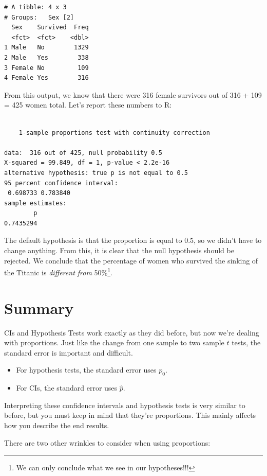 \documentclass[
  letterpaper,
  DIV=11,
  numbers=noendperiod,
  oneside]{scrreprt}
\providecommand{\tightlist}{%
  \setlength{\itemsep}{0pt}\setlength{\parskip}{0pt}}\usepackage{longtable,booktabs,array}
\begin{document}
\begin{verbatim}
# A tibble: 4 x 3
# Groups:   Sex [2]
  Sex    Survived  Freq
  <fct>  <fct>    <dbl>
1 Male   No        1329
2 Male   Yes        338
3 Female No         109
4 Female Yes        316
\end{verbatim}

From this output, we know that there were 316 female survivors out of
316 + 109 = 425 women total. Let's report these numbers to R:

\begin{verbatim}

    1-sample proportions test with continuity correction

data:  316 out of 425, null probability 0.5
X-squared = 99.849, df = 1, p-value < 2.2e-16
alternative hypothesis: true p is not equal to 0.5
95 percent confidence interval:
 0.698733 0.783840
sample estimates:
        p 
0.7435294 
\end{verbatim}

The default hypothesis is that the proportion is equal to 0.5, so we
didn't have to change anything. From this, it is clear that the null
hypothesis should be rejected. We conclude that the percentage of women
who survived the sinking of the Titanic is \emph{different from}
50\%\footnote{We can only conclude what we see in our hypotheses!!!}.

\hypertarget{summary-9}{%
\section{Summary}\label{summary-9}}

CIs and Hypothesis Tests work exactly as they did before, but now we're
dealing with proportions. Just like the change from one sample to two
sample \(t\) tests, the standard error is important and difficult.

\begin{itemize}
\tightlist
\item
  For hypothesis tests, the standard error uses \(p_0\).
\item
  For CIs, the standard error uses \(\hat p\).
\end{itemize}

Interpreting these confidence intervals and hypothesis tests is very
similar to before, but you must keep in mind that they're proportions.
This mainly affects how you describe the end results.

There are two other wrinkles to consider when using proportions:
\end{document}
